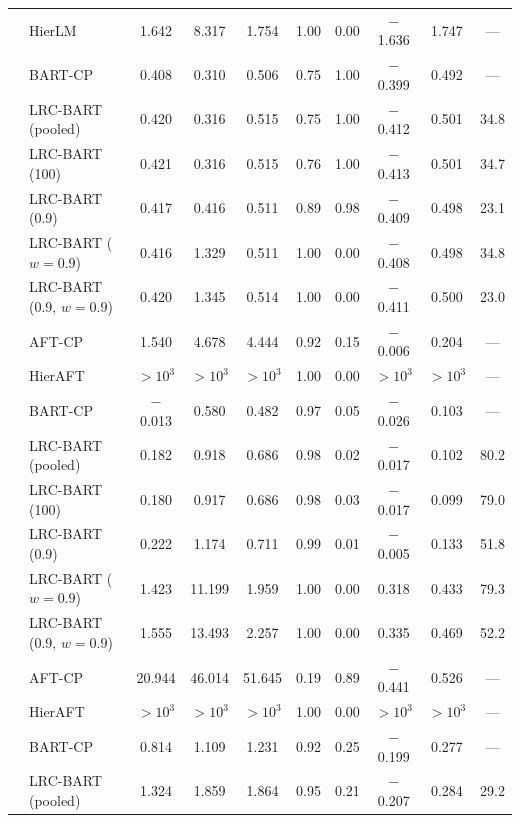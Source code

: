 \begin{center}
\begin{longtable}{llcccccccc}
& HierLM & 1.642 & 8.317 & 1.754 & 1.00 & 0.00 & $-$1.636 & 1.747 & --- \\
& BART-CP & 0.408 & 0.310 & 0.506 & 0.75 & 1.00 & $-$0.399 & 0.492 & --- \\
& LRC-BART (pooled) & 0.420 & 0.316 & 0.515 & 0.75 & 1.00 & $-$0.412 & 0.501 & 34.8 \\
& LRC-BART (100) & 0.421 & 0.316 & 0.515 & 0.76 & 1.00 & $-$0.413 & 0.501 & 34.7 \\
& LRC-BART (0.9) & 0.417 & 0.416 & 0.511 & 0.89 & 0.98 & $-$0.409 & 0.498 & 23.1 \\
& LRC-BART ($w=0.9$) & 0.416 & 1.329 & 0.511 & 1.00 & 0.00 & $-$0.408 & 0.498 & 34.8 \\
& LRC-BART (0.9, $w=0.9$) & 0.420 & 1.345 & 0.514 & 1.00 & 0.00 & $-$0.411 & 0.500 & 23.0 \\
\midrule
{} & AFT-CP & 1.540 & 4.678 & 4.444 & 0.92 & 0.15 & $-$0.006 & 0.204 & --- \\
& HierAFT & $>\!10^{3}$ & $>\!10^{3}$ & $>\!10^{3}$ & 1.00 & 0.00 & $>\!10^{3}$ & $>\!10^{3}$ & --- \\
& BART-CP & $-$0.013 & 0.580 & 0.482 & 0.97 & 0.05 & $-$0.026 & 0.103 & --- \\
& LRC-BART (pooled) & 0.182 & 0.918 & 0.686 & 0.98 & 0.02 & $-$0.017 & 0.102 & 80.2 \\
& LRC-BART (100) & 0.180 & 0.917 & 0.686 & 0.98 & 0.03 & $-$0.017 & 0.099 & 79.0 \\
& LRC-BART (0.9) & 0.222 & 1.174 & 0.711 & 0.99 & 0.01 & $-$0.005 & 0.133 & 51.8 \\
& LRC-BART ($w=0.9$) & 1.423 & 11.199 & 1.959 & 1.00 & 0.00 & 0.318 & 0.433 & 79.3 \\
& LRC-BART (0.9, $w=0.9$) & 1.555 & 13.493 & 2.257 & 1.00 & 0.00 & 0.335 & 0.469 & 52.2 \\
\midrule
{} & AFT-CP & 20.944 & 46.014 & 51.645 & 0.19 & 0.89 & $-$0.441 & 0.526 & --- \\
& HierAFT & $>\!10^{3}$ & $>\!10^{3}$ & $>\!10^{3}$ & 1.00 & 0.00 & $>\!10^{3}$ & $>\!10^{3}$ & --- \\
& BART-CP & 0.814 & 1.109 & 1.231 & 0.92 & 0.25 & $-$0.199 & 0.277 & --- \\
& LRC-BART (pooled) & 1.324 & 1.859 & 1.864 & 0.95 & 0.21 & $-$0.207 & 0.284 & 29.2 \\

\end{longtable}
\end{center}
